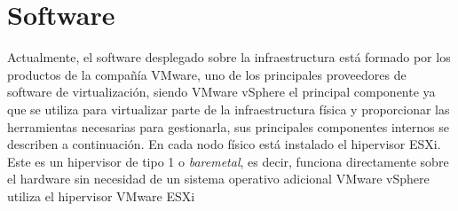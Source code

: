 \section{Software}
\label{subsec:softwareinstalado}
Actualmente, el software desplegado sobre la infraestructura está formado por los productos de la compañía VMware, uno de los principales proveedores de software de virtualización, siendo VMware vSphere el principal componente ya que se utiliza para virtualizar parte de la infraestructura física y proporcionar las herramientas necesarias para gestionarla, sus principales componentes internos se describen a continuación.
En cada nodo físico está instalado el hipervisor ESXi. Este es un hipervisor de tipo 1 o \textit{baremetal}, es decir, funciona directamente sobre el hardware sin necesidad de un sistema operativo adicional VMware vSphere utiliza el hipervisor VMware ESXi


